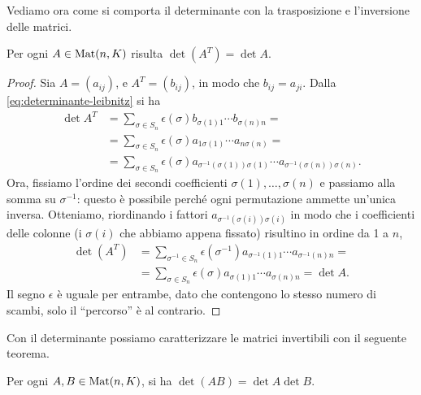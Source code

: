 Vediamo ora come si comporta il determinante con la trasposizione e l'inversione delle matrici.
\begin{teorema} \label{t:determinante-trasposta}
	Per ogni $A\in\operatorname{Mat}(n,K)$ risulta $\det(A^T)=\det A$.
\end{teorema}
	\begin{proof}
	Sia $A=(a_{ij})$, e $A^T=(b_{ij})$, in modo che $b_{ij}=a_{ji}$.
	Dalla \eqref{eq:determinante-leibnitz} si ha
	\begin{equation}
		\begin{split}
			\det A^T &=\sum_{\sigma\in S_n}\epsilon(\sigma)b_{\sigma(1)1}\cdots b_{\sigma(n)n}=\\
			&=\sum_{\sigma\in S_n}\epsilon(\sigma)a_{1\sigma(1)}\cdots a_{n\sigma(n)}=\\
			&=\sum_{\sigma\in S_n}\epsilon(\sigma)a_{\sigma^{-1}(\sigma(1))\sigma(1)}\cdots a_{\sigma^{-1}(\sigma(n))\sigma(n)}.
		\end{split}
	\end{equation}
	Ora, fissiamo l'ordine dei secondi coefficienti $\sigma(1),\dots,\sigma(n)$ e passiamo alla somma su $\sigma^{-1}$: questo è possibile perch\'e ogni permutazione ammette un'unica inversa.
	Otteniamo, riordinando i fattori $a_{\sigma^{-1}(\sigma(i))\sigma(i)}$ in modo che i coefficienti delle colonne (i $\sigma(i)$ che abbiamo appena fissato) risultino in ordine da 1 a $n$,
	\begin{equation}
		\begin{split}
			\det(A^T)&=\sum_{\sigma^{-1}\in S_n}\epsilon(\sigma^{-1})a_{\sigma^{-1}(1)1}\cdots a_{\sigma^{-1}(n)n}=\\
			&=\sum_{\sigma\in S_n}\epsilon(\sigma)a_{\sigma(1)1}\cdots a_{\sigma(n)n}=\det A.
		\end{split}
	\end{equation}
	Il segno $\epsilon$ è uguale per entrambe, dato che contengono lo stesso numero di scambi, solo il ``percorso'' è al contrario.
\end{proof}
Con il determinante possiamo caratterizzare le matrici invertibili con il seguente teorema.
\begin{teorema}[di Binet] \label{t:binet}
	Per ogni $A,B\in\operatorname{Mat}(n,K)$, si ha $\det(AB)=\det A\det B$.
\end{teorema}
